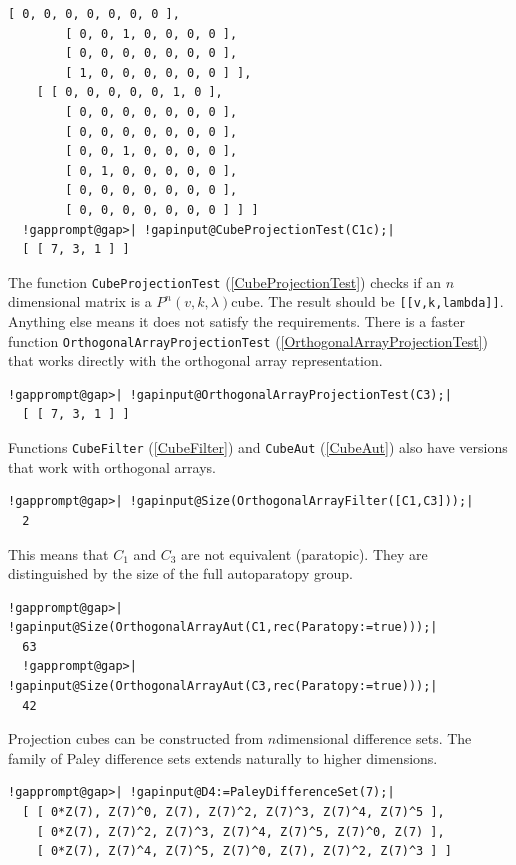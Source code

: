 \documentclass[a4paper,11pt]{report}
\begin{document}
{{\begin{Verbatim}[commandchars=!@|,fontsize=\small,frame=single,label=Example]
        [ 0, 0, 0, 0, 0, 0, 0 ], 
        [ 0, 0, 1, 0, 0, 0, 0 ], 
        [ 0, 0, 0, 0, 0, 0, 0 ], 
        [ 1, 0, 0, 0, 0, 0, 0 ] ], 
    [ [ 0, 0, 0, 0, 0, 1, 0 ], 
        [ 0, 0, 0, 0, 0, 0, 0 ], 
        [ 0, 0, 0, 0, 0, 0, 0 ], 
        [ 0, 0, 1, 0, 0, 0, 0 ], 
        [ 0, 1, 0, 0, 0, 0, 0 ], 
        [ 0, 0, 0, 0, 0, 0, 0 ], 
        [ 0, 0, 0, 0, 0, 0, 0 ] ] ]
  !gapprompt@gap>| !gapinput@CubeProjectionTest(C1c);|
  [ [ 7, 3, 1 ] ]
\end{Verbatim}
 The function \texttt{CubeProjectionTest} (\ref{CubeProjectionTest}) checks if an $n$\texttt{}dimensional matrix is a $P^n(v,k,\lambda)$\texttt{}cube. The result should be \texttt{[[v,k,lambda]]}. Anything else means it does not satisfy the requirements. There is a faster
function \texttt{OrthogonalArrayProjectionTest} (\ref{OrthogonalArrayProjectionTest}) that works directly with the orthogonal array representation. 
\begin{Verbatim}[commandchars=!@|,fontsize=\small,frame=single,label=Example]
  !gapprompt@gap>| !gapinput@OrthogonalArrayProjectionTest(C3);|
  [ [ 7, 3, 1 ] ]
\end{Verbatim}
 Functions \texttt{CubeFilter} (\ref{CubeFilter}) and \texttt{CubeAut} (\ref{CubeAut}) also have versions that work with orthogonal arrays. 
\begin{Verbatim}[commandchars=!@|,fontsize=\small,frame=single,label=Example]
  !gapprompt@gap>| !gapinput@Size(OrthogonalArrayFilter([C1,C3]));|
  2
\end{Verbatim}
 This means that $C_1$ and $C_3$ are not equivalent (paratopic). They are distinguished by the size of the full
autoparatopy group. 
\begin{Verbatim}[commandchars=!@|,fontsize=\small,frame=single,label=Example]
  !gapprompt@gap>| !gapinput@Size(OrthogonalArrayAut(C1,rec(Paratopy:=true)));|
  63
  !gapprompt@gap>| !gapinput@Size(OrthogonalArrayAut(C3,rec(Paratopy:=true)));|
  42
\end{Verbatim}
 Projection cubes can be constructed from $n$\texttt{}dimensional difference sets. The family of Paley
difference sets extends naturally to higher dimensions. 
\begin{Verbatim}[commandchars=!@|,fontsize=\small,frame=single,label=Example]
  !gapprompt@gap>| !gapinput@D4:=PaleyDifferenceSet(7);|
  [ [ 0*Z(7), Z(7)^0, Z(7), Z(7)^2, Z(7)^3, Z(7)^4, Z(7)^5 ], 
    [ 0*Z(7), Z(7)^2, Z(7)^3, Z(7)^4, Z(7)^5, Z(7)^0, Z(7) ], 
    [ 0*Z(7), Z(7)^4, Z(7)^5, Z(7)^0, Z(7), Z(7)^2, Z(7)^3 ] ]

\end{Verbatim}}}
\end{document}
